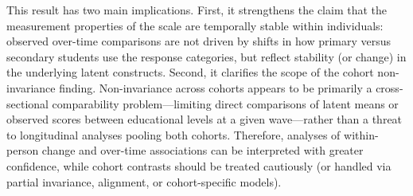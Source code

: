 \documentclass[
  12pt,
]{article}
\begin{document}
\begin{table}

\caption{\label{tbl-conditional}Conditional longitudinal invariance by
cohort level}


\end{table}%

This result has two main implications. First, it strengthens the claim
that the measurement properties of the scale are temporally stable
within individuals: observed over-time comparisons are not driven by
shifts in how primary versus secondary students use the response
categories, but reflect stability (or change) in the underlying latent
constructs. Second, it clarifies the scope of the cohort non-invariance
finding. Non-invariance across cohorts appears to be primarily a
cross-sectional comparability problem---limiting direct comparisons of
latent means or observed scores between educational levels at a given
wave---rather than a threat to longitudinal analyses pooling both
cohorts. Therefore, analyses of within-person change and over-time
associations can be interpreted with greater confidence, while cohort
contrasts should be treated cautiously (or handled via partial
invariance, alignment, or cohort-specific models).
\end{document}
